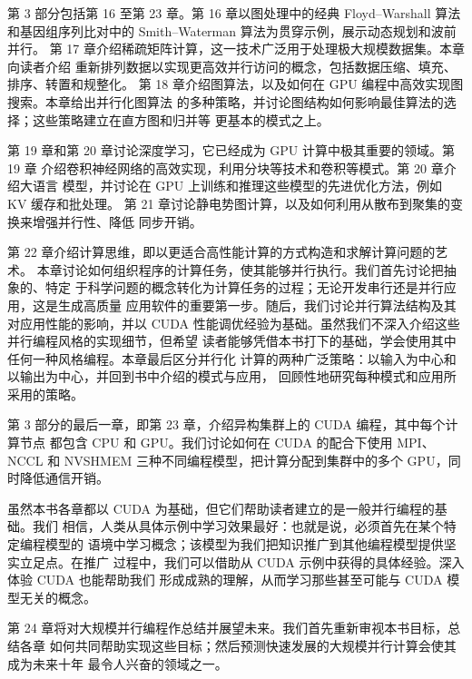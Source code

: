 第 3 部分包括第 16 至第 23 章。第 16 章以图处理中的经典 Floyd--Warshall 算法
和基因组序列比对中的 Smith--Waterman 算法为贯穿示例，展示动态规划和波前并行。
第 17 章介绍稀疏矩阵计算，这一技术广泛用于处理极大规模数据集。本章向读者介绍
重新排列数据以实现更高效并行访问的概念，包括数据压缩、填充、排序、转置和规整化。
第 18 章介绍图算法，以及如何在 GPU 编程中高效实现图搜索。本章给出并行化图算法
的多种策略，并讨论图结构如何影响最佳算法的选择；这些策略建立在直方图和归并等
更基本的模式之上。

第 19 章和第 20 章讨论深度学习，它已经成为 GPU 计算中极其重要的领域。第 19 章
介绍卷积神经网络的高效实现，利用分块等技术和卷积等模式。第 20 章介绍大语言
模型，并讨论在 GPU 上训练和推理这些模型的先进优化方法，例如 KV 缓存和批处理。
第 21 章讨论静电势图计算，以及如何利用从散布到聚集的变换来增强并行性、降低
同步开销。

第 22 章介绍计算思维，即以更适合高性能计算的方式构造和求解计算问题的艺术。
本章讨论如何组织程序的计算任务，使其能够并行执行。我们首先讨论把抽象的、特定
于科学问题的概念转化为计算任务的过程；无论开发串行还是并行应用，这是生成高质量
应用软件的重要第一步。随后，我们讨论并行算法结构及其对应用性能的影响，并以
CUDA 性能调优经验为基础。虽然我们不深入介绍这些并行编程风格的实现细节，但希望
读者能够凭借本书打下的基础，学会使用其中任何一种风格编程。本章最后区分并行化
计算的两种广泛策略：以输入为中心和以输出为中心，并回到书中介绍的模式与应用，
回顾性地研究每种模式和应用所采用的策略。

第 3 部分的最后一章，即第 23 章，介绍异构集群上的 CUDA 编程，其中每个计算节点
都包含 CPU 和 GPU。我们讨论如何在 CUDA 的配合下使用 MPI、NCCL 和 NVSHMEM
三种不同编程模型，把计算分配到集群中的多个 GPU，同时降低通信开销。

虽然本书各章都以 CUDA 为基础，但它们帮助读者建立的是一般并行编程的基础。我们
相信，人类从具体示例中学习效果最好：也就是说，必须首先在某个特定编程模型的
语境中学习概念；该模型为我们把知识推广到其他编程模型提供坚实立足点。在推广
过程中，我们可以借助从 CUDA 示例中获得的具体经验。深入体验 CUDA 也能帮助我们
形成成熟的理解，从而学习那些甚至可能与 CUDA 模型无关的概念。

第 24 章将对大规模并行编程作总结并展望未来。我们首先重新审视本书目标，总结各章
如何共同帮助实现这些目标；然后预测快速发展的大规模并行计算会使其成为未来十年
最令人兴奋的领域之一。

